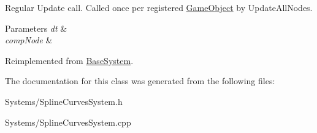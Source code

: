 Regular Update call. Called once per registered \hyperlink{classGameObject}{Game\+Object} by Update\+All\+Nodes. 


\begin{DoxyParams}{Parameters}
{\em dt} & \\
\hline
{\em comp\+Node} & \\
\hline
\end{DoxyParams}


Reimplemented from \hyperlink{classBaseSystem_a465191589a1ef8b8f3a8e20fa4656d47}{Base\+System}.



The documentation for this class was generated from the following files\+:\begin{DoxyCompactItemize}
\item 
Systems/Spline\+Curves\+System.\+h\item 
Systems/Spline\+Curves\+System.\+cpp\end{DoxyCompactItemize}
